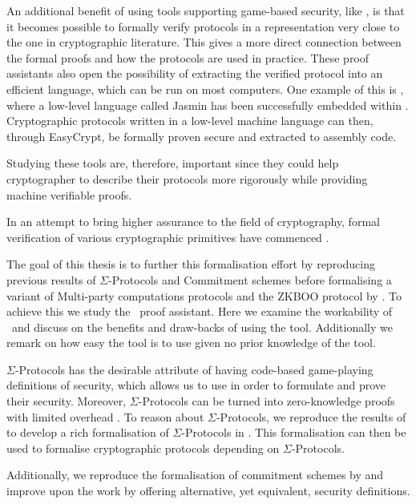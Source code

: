 An additional benefit of using tools supporting game-based security, like \easycrypt, is that
it becomes possible to formally verify protocols in a representation very close
to the one in cryptographic literature. This gives a more direct connection between
the formal proofs and how the protocols are used in practice.
These proof assistants also open the possibility of extracting the verified
protocol into an efficient language, which can be run on most computers.
One example of this is \easycrypt, where a low-level language called Jasmin has
been successfully embedded within \cite{easycrypt-jasmin}.
Cryptographic protocols written in a low-level machine language can
then, through EasyCrypt, be formally proven secure and extracted to assembly code.

Studying these tools are, therefore, important since they could help
cryptographer to describe their protocols more rigorously while providing
machine verifiable proofs.

In an attempt to bring higher assurance to the field of cryptography, formal
verification of various cryptographic primitives have commenced
\cite{SOK:CAC,ec_intro,cryptoeprint:2019:1185,certicrypt_sigma,DBLP:journals/corr/abs-1805-12482,DBLP:journals/corr/abs-1806-07197}.

The goal of this thesis is to further this formalisation effort by reproducing
previous results of $\Sigma$-Protocols and Commitment schemes before formalising
a variant of Multi-party computations protocols and the ZKBOO protocol by
\cite{zkboo}.
To achieve this we study the \easycrypt\ proof assistant.
Here we examine the workability of \easycrypt\ and discuss
on the benefits and draw-backs of using the tool. Additionally we remark on how
easy the tool is to use given no prior knowledge of the tool.

$\Sigma$-Protocols has the desirable attribute of having code-based
game-playing definitions of security, which allows us to use \easycrypt in order to formulate
and prove their security. Moreover, $\Sigma$-Protocols can be turned into
zero-knowledge proofs with limited overhead \cite{zkboo}.
To reason about $\Sigma$-Protocols, we reproduce the results of \cite{cryptoeprint:2019:1185} to
develop a rich formalisation of $\Sigma$-Protocols in \easycrypt.
This formalisation can then be used to formalise cryptographic protocols
depending on $\Sigma$-Protocols.

Additionally, we reproduce the formalisation of commitment schemes by
\cite{DBLP:journals/corr/MetereD17} and improve upon the work by offering
alternative, yet equivalent, security definitions.

